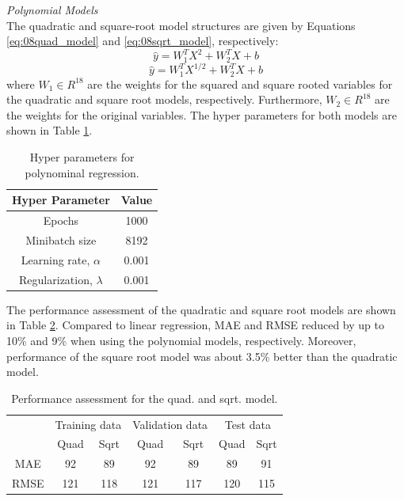 %
%
\noindent
\textit{Polynomial Models} \\
The quadratic and square-root model structures are given by Equations \ref{eq:08quad_model} and \ref{eq:08sqrt_model}, respectively:
\begin{equation}
    \hat{y} = W_1^T X^2 + W^T_2 X + b
    \label{eq:08quad_model}
\end{equation}
\begin{equation}
    \hat{y} = W_1^T X^{1/2} + W^T_2 X + b
    \label{eq:08sqrt_model}
\end{equation}
where $W_1 \in R^{18}$ are the weights for the squared and square rooted variables for the quadratic and square root models, respectively. Furthermore, $W_2 \in R^{18}$ are the weights for the original variables. The hyper parameters for both models are shown in Table \ref{tab:08poly_hp}.
\begin{table}[h]
    \centering
    {
    \begin{tabular}{ c | c}
        Hyper Parameter                  &  Value       \\
        \hline
        Epochs                           &  1000      \\
        Minibatch size                   &  8192     \\
        Learning rate, $\alpha$          &  0.001    \\
        Regularization, $\lambda$          &  0.001  \\
    \end{tabular}}
    \caption{Hyper parameters for polynominal regression.}
    \label{tab:08poly_hp}
\end{table}

The performance assessment of the quadratic and square root models are shown in Table \ref{tab:08quad_sqrt_performance}. Compared to linear regression, MAE and RMSE reduced by up to 10\% and 9\% when using the polynomial models, respectively. Moreover, performance of the square root model was about 3.5\% better than the quadratic model.
\begin{table}[h]
    \centering
    {
    \begin{tabular}{c|c|c|c|c|c|c|}
      & \multicolumn{2}{c|}{Training data} & \multicolumn{2}{c|}{Validation data} & \multicolumn{2}{c|}{Test data} \\ \cline{2-7} 
      & Quad             & Sqrt            & \multicolumn{1}{c|}{Quad}   & Sqrt   & Quad           & Sqrt          \\ \hline
    MAE   & 92               & 89              & 92                          & 89     & 89             & 91            \\
    RMSE  & 121              & 118             & \multicolumn{1}{c|}{121}    & 117    & 120            & 115           \\
    \end{tabular}}
    \caption{Performance assessment for the quad. and sqrt. model.}
    \label{tab:08quad_sqrt_performance}
\end{table}

